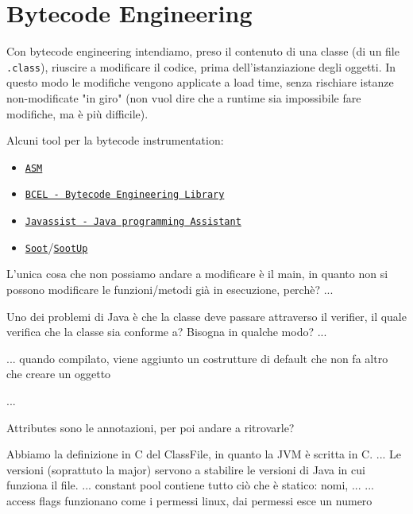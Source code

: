 \section{Bytecode Engineering}

Con bytecode engineering intendiamo, preso il contenuto di una classe (di un file \texttt{.class}), riuscire a modificare il codice, prima dell'istanziazione degli oggetti. In questo modo le modifiche vengono applicate a load time, senza rischiare istanze non-modificate "in giro" (non vuol dire che a runtime sia impossibile fare modifiche, ma è più difficile).

Alcuni tool per la bytecode instrumentation:
\begin{itemize}
    \item \href{https://asm.ow2.io/}{\texttt{ASM}}

    \item \href{https://commons.apache.org/proper/commons-bcel/}{\texttt{BCEL - Bytecode Engineering Library}}

    \item \href{https://www.javassist.org/}{\texttt{Javassist - Java programming Assistant}}

    \item \href{https://github.com/soot-oss/soot}{\texttt{Soot}}/\href{https://github.com/soot-oss/SootUp}{\texttt{SootUp}}
\end{itemize}


L'unica cosa che non possiamo andare a modificare è il main, in quanto non si possono modificare le funzioni/metodi già in esecuzione, perchè?
...

Uno dei problemi di Java è che la classe deve passare attraverso il verifier, il quale verifica che la classe sia conforme a? Bisogna in qualche modo?
...



... quando compilato, viene aggiunto un costrutture di default che non fa altro che creare un oggetto


...

Attributes sono le annotazioni, per poi andare a ritrovarle?

Abbiamo la definizione in C del ClassFile, in quanto la JVM è scritta in C.
...
Le versioni (soprattuto la major) servono a stabilire le versioni di Java in cui funziona il file.
...
constant pool contiene tutto ciò che è statico: nomi, ...
...
access flags funzionano come i permessi linux, dai permessi esce un numero

